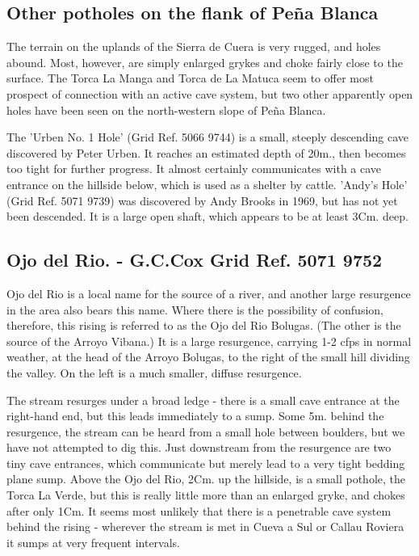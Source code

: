 \documentclass[11pt, a4paper, twoside]{memoir}
\begin{document}
\subsection*{Other potholes on the flank of Peña Blanca}

The terrain on the uplands of the Sierra de Cuera is very rugged, and holes abound. Most, however, are simply enlarged grykes and choke fairly close to the surface. The Torca La Manga and Torca de La Matuca seem to offer most prospect of connection with an active cave system, but two other apparently open holes have been seen on the north-western slope of Peña Blanca.

The 'Urben No. 1 Hole' (Grid Ref. 5066 9744) is a small, steeply descending cave discovered by Peter Urben. It reaches an estimated depth of 20m., then becomes too tight for further progress. It almost certainly communicates with a cave entrance on the hillside below, which is used as a shelter by cattle. 'Andy's Hole' (Grid Ref. 5071 9739) was discovered by Andy Brooks in 1969, but has not yet been descended. It is a large open shaft, which appears to be at least 3Cm. deep.




\subsection*{Ojo del Rio. - G.C.Cox Grid Ref. 5071 9752}

Ojo del Rio is a local name for the source of a river, and another large resurgence in the area also bears this name. Where there is the possibility of confusion, therefore, this rising is referred to as the Ojo del Rio Bolugas. (The other is the source of the Arroyo Vibana.) It is a large resurgence, carrying 1-2 cfps in normal weather, at the head of the Arroyo Bolugas, to the right of the small hill dividing the valley. On the left is a much smaller, diffuse resurgence.

The stream resurges under a broad ledge - there is a small cave entrance at the right-hand end, but this leads immediately to a sump. Some 5m. behind the resurgence, the stream can be heard from a small hole between boulders, but we have not attempted to dig this. Just downstream from the resurgence are two tiny cave entrances, which communicate but merely lead to a very tight bedding plane sump. Above the Ojo del Rio, 2Cm. up the hillside, is a small pothole, the Torca La Verde, but this is really little more than an enlarged gryke, and chokes after only 1Cm. It seems most unlikely that there is a penetrable cave system behind the rising - wherever the stream is met in Cueva a Sul or Callau Roviera it sumps at very frequent intervals.
\end{document}
